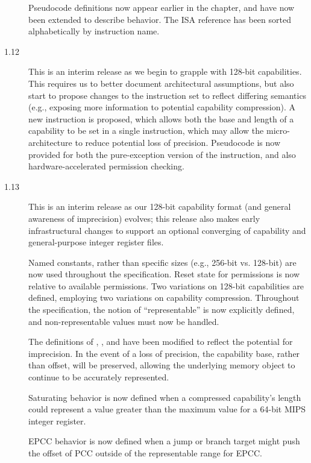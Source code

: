 \begin{description}
  Pseudocode definitions now appear earlier in the chapter, and have now been
    extended to describe \EPCC{} behavior.
  The ISA reference has been sorted alphabetically by instruction name.

\item[1.12] This is an interim release as we begin to grapple with 128-bit
  capabilities.
  This requires us to better document architectural assumptions, but also
  start to propose changes to the instruction set to reflect differing
  semantics (e.g., exposing more information to potential capability
  compression).
  A new  instruction is proposed, which allows both
  the base and length of a capability to be set in a single instruction, which
  may allow the micro-architecture to reduce potential loss of precision.
  Pseudocode is now provided for both the pure-exception version of the
   instruction, and also hardware-accelerated permission
  checking.

\item[1.13] This is an interim release as our 128-bit capability format (and
  general awareness of imprecision) evolves; this release also makes early
  infrastructural changes to support an optional converging of capability and
  general-purpose integer register files.

  Named constants, rather than specific sizes (e.g., 256-bit vs. 128-bit) are
  now used throughout the specification.
  Reset state for permissions is now relative to available permissions.
  Two variations on 128-bit capabilities are defined, employing two variations
  on capability compression.
  Throughout the specification, the notion of ``representable'' is now
  explicitly defined, and non-representable values must now be handled.

  The definitions of , , and
   have been modified to reflect the potential for
  imprecision.
  In the event of a loss of precision, the capability base, rather than
  offset, will be preserved, allowing the underlying memory object to continue
  to be accurately represented.

  Saturating behavior is now defined when a compressed capability's length
  could represent a value greater than the maximum value for a 64-bit MIPS
  integer register.

  EPCC behavior is now defined when a jump or branch target might push the
  offset of PCC outside of the representable range for EPCC.


\end{description}

